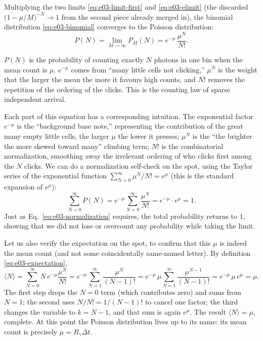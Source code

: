 Multiplying the two limits \eqref{eq:e03-limit-first} and \eqref{eq:e03-elimit} (the discarded $\big(1-\mu/M\big)^{-N}\to1$ from the second piece already merged in), the binomial distribution \eqref{eq:e03-binomial} converges to the Poisson distribution:
\begin{equation}
  P(N)=\lim_{M\to\infty}P_M(N)
  =e^{-\mu}\,\frac{\mu^{N}}{N!}.
  \label{eq:e03-poisson}
\end{equation}
\begin{formulaexplain}
$P(N)$ is the probability of counting exactly $N$ photons in one bin when the mean count is $\mu$. $e^{-\mu}$ comes from ``many little cells not clicking,'' $\mu^{N}$ is the weight that the larger the mean the more it favours high counts, and $N!$ removes the repetition of the ordering of the clicks. This is the counting law of sparse independent arrival.
\end{formulaexplain}
Each part of this equation has a corresponding intuition. The exponential factor $e^{-\mu}$ is the ``background base note,'' representing the contribution of the great many empty little cells, the larger $\mu$ the lower it presses; $\mu^{N}$ is the ``the brighter the more skewed toward many'' climbing term; $N!$ is the combinatorial normalization, smoothing away the irrelevant ordering of who clicks first among the $N$ clicks. We can do a normalization self-check on the spot, using the Taylor series of the exponential function $\sum_{N=0}^{\infty}\mu^{N}/N!=e^{\mu}$ (this is the standard expansion of $e^{\mu}$):
\[
  \sum_{N=0}^{\infty}P(N)
  =e^{-\mu}\sum_{N=0}^{\infty}\frac{\mu^{N}}{N!}
  =e^{-\mu}\cdot e^{\mu}=1 .
\]
Just as Eq.~\eqref{eq:e03-normalization} requires, the total probability returns to $1$, showing that we did not lose or overcount any probability while taking the limit.

Let us also verify the expectation on the spot, to confirm that this $\mu$ is indeed the mean count (and not some coincidentally same-named letter). By definition \eqref{eq:e03-expectation},
\[
  \langle N\rangle
  =\sum_{N=0}^{\infty}N\,e^{-\mu}\frac{\mu^{N}}{N!}
  =e^{-\mu}\sum_{N=1}^{\infty}\frac{\mu^{N}}{(N-1)!}
  =e^{-\mu}\,\mu\sum_{N=1}^{\infty}\frac{\mu^{N-1}}{(N-1)!}
  =e^{-\mu}\,\mu\,e^{\mu}=\mu .
\]
The first step drops the $N=0$ term (which contributes zero) and sums from $N=1$; the second uses $N/N!=1/(N-1)!$ to cancel one factor; the third changes the variable to $k=N-1$, and that sum is again $e^{\mu}$. The result $\langle N\rangle=\mu$, complete. At this point the Poisson distribution lives up to its name: its mean count is precisely $\mu=R_\gamma\Delta t$.

